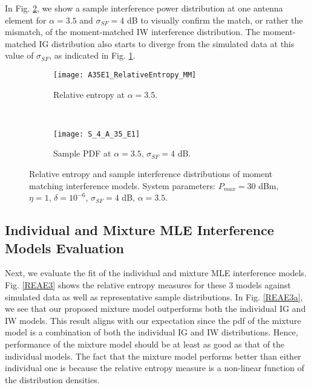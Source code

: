 \documentclass[12pt, draftclsnofoot, onecolumn]{IEEEtran}
\theoremstyle{plain}
\begin{document}
In Fig. \ref{REAE1b}, we show a sample interference power distribution at one antenna element for $\alpha=3.5$ and $\sigma_{SF}=4$ dB to visually confirm the match, or rather the mismatch, of the moment-matched IW interference distribution. The moment-matched IG distribution also starts to diverge from the simulated data at this value of $\sigma_{SF}$, as indicated in Fig. \ref{REAE1a}.
\begin{figure*}[t!]
    \centering
    \begin{subfigure}[t]{0.45\textwidth}
        \centering
        \texttt{[image: A35E1\_RelativeEntropy\_MM]}
        \vspace{-0.16in}
        \caption{{\small Relative entropy at $\alpha=3.5$.}}
        \label{REAE1a}
    \end{subfigure}%
    ~ 
    \begin{subfigure}[t]{0.45\textwidth}
        \centering
        \texttt{[image: S\_4\_A\_35\_E1]}
        \vspace{-0.16in}
        \caption{{\small Sample PDF at $\alpha=3.5$, $\sigma_{SF}=4$ dB.}}
        \label{REAE1b}
    \end{subfigure}\vspace{-0.4in}
    \caption{{\small Relative entropy and sample interference distributions of moment matching interference models. System parameters: $P_{max}=30$ dBm, $\eta=1$, $\delta=10^{-6}$, $\sigma_{SF}=4$ dB, $\alpha=3.5$.}} \label{REAE1}
	\vspace{-0.45in}
	\vspace{-.15in}
\end{figure*}
\vspace{-.15in}
\subsection{Individual and Mixture MLE Interference Models Evaluation}
\vspace{-.1in}
Next, we evaluate the fit of the individual and mixture MLE interference models. Fig. \ref{REAE3} shows the relative entropy measures for these 3 models against simulated data as well as representative sample distributions.
%
In Fig. \ref{REAE3a}, we see that our proposed mixture model outperforms both the individual IG and IW models. This result aligns with our expectation since the {\color{black}pdf} of the mixture model is a combination of both the individual IG and IW distributions. Hence, performance of the mixture model should be at least as good as that of the individual models. The fact that the mixture model performs better than either individual one is because the relative entropy measure is a non-linear function of the distribution densities.
\end{document}
